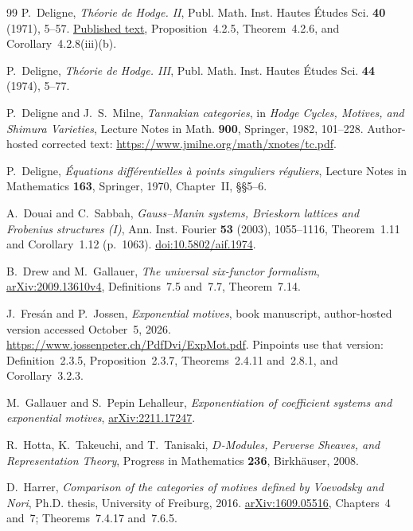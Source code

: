 \documentclass[11pt]{article}
\numberwithin{equation}{section}
\theoremstyle{definition}
\theoremstyle{remark}
\begin{document}
\begin{thebibliography}{99}
P.~Deligne,
\emph{Th\'eorie de Hodge. II},
Publ. Math. Inst. Hautes \'Etudes Sci. \textbf{40} (1971), 5--57.
\href{https://www.numdam.org/item/PMIHES_1971__40__5_0/}{Published text},
Proposition~4.2.5, Theorem~4.2.6, and Corollary~4.2.8(iii)(b).

P.~Deligne,
\emph{Th\'eorie de Hodge. III},
Publ. Math. Inst. Hautes \'Etudes Sci. \textbf{44} (1974), 5--77.

P.~Deligne and J.~S.~Milne, \emph{Tannakian categories}, in
\emph{Hodge Cycles, Motives, and Shimura Varieties}, Lecture Notes in Math.
\textbf{900}, Springer, 1982, 101--228. Author-hosted corrected text:
\url{https://www.jmilne.org/math/xnotes/tc.pdf}.

P.~Deligne, \emph{\'Equations diff\'erentielles \`a points singuliers
r\'eguliers}, Lecture Notes in Mathematics \textbf{163}, Springer, 1970,
Chapter~II, \S\S5--6.

A.~Douai and C.~Sabbah, \emph{Gauss--Manin systems, Brieskorn lattices
and Frobenius structures (I)}, Ann. Inst. Fourier \textbf{53} (2003),
1055--1116, Theorem~1.11 and Corollary~1.12 (p.~1063).
\href{https://doi.org/10.5802/aif.1974}{doi:10.5802/aif.1974}.

B.~Drew and M.~Gallauer,
\emph{The universal six-functor formalism},
\href{https://arxiv.org/abs/2009.13610v4}{arXiv:2009.13610v4},
Definitions~7.5 and~7.7, Theorem~7.14.

J.~Fres\'an and P.~Jossen, \emph{Exponential motives},
book manuscript, author-hosted version accessed October~5, 2026.
\url{https://www.jossenpeter.ch/PdfDvi/ExpMot.pdf}.
Pinpoints use that version: Definition~2.3.5, Proposition~2.3.7,
Theorems~2.4.11 and~2.8.1, and Corollary~3.2.3.

M.~Gallauer and S.~Pepin Lehalleur, \emph{Exponentiation of coefficient
systems and exponential motives}, \href{https://arxiv.org/abs/2211.17247}{arXiv:2211.17247}.

R.~Hotta, K.~Takeuchi, and T.~Tanisaki,
\emph{$D$-Modules, Perverse Sheaves, and Representation Theory},
Progress in Mathematics \textbf{236}, Birkh\"auser, 2008.

D.~Harrer,
\emph{Comparison of the categories of motives defined by Voevodsky and Nori},
Ph.D. thesis, University of Freiburg, 2016.
\href{https://arxiv.org/abs/1609.05516}{arXiv:1609.05516},
Chapters~4 and~7; Theorems~7.4.17 and~7.6.5.


\end{thebibliography}
\end{document}
